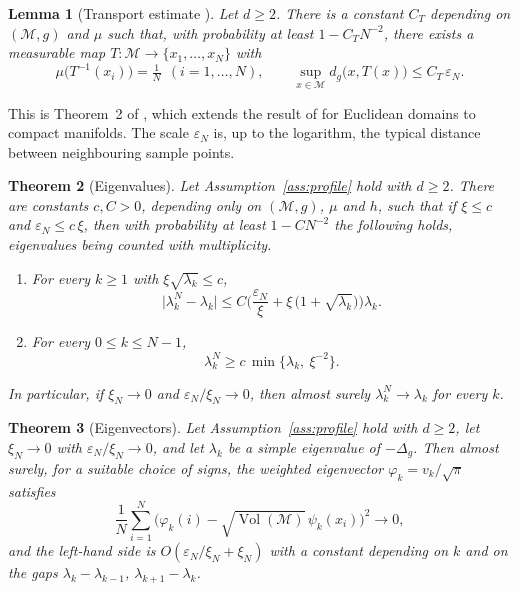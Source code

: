 \documentclass[11pt,a4paper]{article}
\theoremstyle{stmt}
\newtheorem{theorem}{Theorem}[section]
\newtheorem{lemma}[theorem]{Lemma}
\theoremstyle{defn}
\theoremstyle{rmk}
\numberwithin{equation}{section}
\DeclareMathOperator{\Vol}{Vol}
\newcommand{\M}{\mathcal{M}}
\begin{document}
\begin{lemma}[Transport estimate \cite{GTS,GTGHS}]\label{lem:transport}
Let $d\ge2$. There is a constant $C_T$ depending on $(\M,g)$ and $\mu$ such that, with probability at least $1-C_TN^{-2}$, there exists a measurable map $T:\M\to\{x_1,\dots,x_N\}$ with
\begin{equation}
\mu\big(T^{-1}(x_i)\big)=\tfrac1N\ \ (i=1,\dots,N),\qquad \sup_{x\in\M}d_g\big(x,T(x)\big)\le C_T\,\varepsilon_N .
\end{equation}
\end{lemma}

This is Theorem~2 of \cite{GTGHS}, which extends the result of \cite{GTS} for Euclidean domains to compact manifolds. The scale $\varepsilon_N$ is, up to the logarithm, the typical distance between neighbouring sample points.

\begin{theorem}[Eigenvalues]\label{thm:eig}
Let Assumption~\ref{ass:profile} hold with $d\ge2$. There are constants $c,C>0$, depending only on $(\M,g)$, $\mu$ and $h$, such that if $\xi\le c$ and $\varepsilon_N\le c\,\xi$, then with probability at least $1-CN^{-2}$ the following holds, eigenvalues being counted with multiplicity.
\begin{enumerate}[label=\textup{(\roman*)}]
\item For every $k\ge1$ with $\xi\sqrt{\lambda_k}\le c$,
\begin{equation}\label{eq:eigrate}
\big|\lambda_k^N-\lambda_k\big|\le C\Big(\frac{\varepsilon_N}{\xi}+\xi\,\big(1+\sqrt{\lambda_k}\big)\Big)\lambda_k .
\end{equation}
\item For every $0\le k\le N-1$,
\begin{equation}\label{eq:eiglow}
\lambda_k^N\ge c\,\min\big\{\lambda_k,\ \xi^{-2}\big\}.
\end{equation}
\end{enumerate}
In particular, if $\xi_N\to0$ and $\varepsilon_N/\xi_N\to0$, then almost surely $\lambda_k^N\to\lambda_k$ for every $k$.
\end{theorem}

\begin{theorem}[Eigenvectors]\label{thm:evec}
Let Assumption~\ref{ass:profile} hold with $d\ge2$, let $\xi_N\to0$ with $\varepsilon_N/\xi_N\to0$, and let $\lambda_k$ be a simple eigenvalue of $-\Delta_g$. Then almost surely, for a suitable choice of signs, the weighted eigenvector $\varphi_k=v_k/\sqrt\pi$ satisfies
\begin{equation}\label{eq:evec}
\frac1N\sum_{i=1}^N\Big(\varphi_k(i)-\sqrt{\Vol(\M)}\,\psi_k(x_i)\Big)^2\longrightarrow0 ,
\end{equation}
and the left-hand side is $O(\varepsilon_N/\xi_N+\xi_N)$ with a constant depending on $k$ and on the gaps $\lambda_k-\lambda_{k-1}$, $\lambda_{k+1}-\lambda_k$.
\end{theorem}
\end{document}
